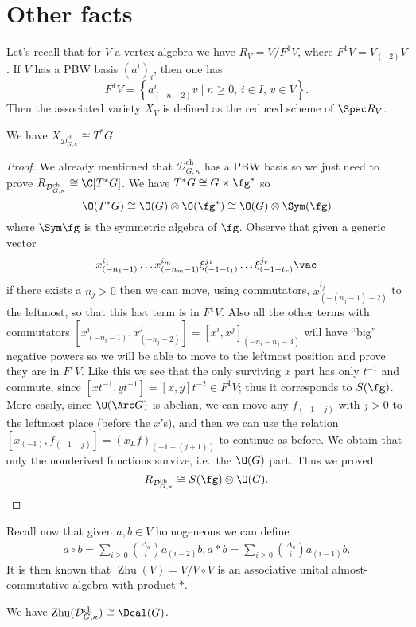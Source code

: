 \documentclass[a4paper, 10pt]{article}
\newcommand{\Dc}{ \mathcal{D}^{\mathrm{ch}}_{G, \kappa} }         %
\DeclareMathOperator{\Zhu}{ Zhu}                             %
\begin{document}
    \section{Other facts}
        Let's recall that for $V$ a vertex algebra we have $R_V = V/F^1V$, where $F^1V= V_{(-2)}V$. If $V$ has a PBW basis $(a^i)_i$, then one has \[F^1V = \left\{a^i_{(-n-2)}v \mid n \geq 0,\, i \in I,\, v \in V \right\}. \]
        Then the associated variety $X_V$ is defined as the reduced scheme of $\Spec R_V$.
        \begin{prop}
            We have $X_{\Dc} \cong T^*G$.
        \end{prop}
        \begin{proof}
            We already mentioned that $\Dc$ has a PBW basis so we just need to prove $R_{\Dc} \cong \C[T^*G]$. We have $T^*G \cong G \times \fg^*$ so \[\O(T^*G) \cong \O(G) \otimes \O(\fg^*) \cong \O(G) \otimes \Sym (\fg)\] where $\Sym\fg$ is the symmetric algebra of $\fg$. Observe that given a generic vector \[x^{i_1}_{(-n_1-1)}\dots x^{i_m}_{(-n_m-1)}\xi^{j_1}_{(-1-t_1)}\dots\xi^{j_r}_{(-1-t_r)} \vac \] if there exists a $n_j > 0$ then we can move, using commutators, $x^{i_j}_{(-(n_j-1)-2)}$ to the leftmost, so that this last term is in $F^1V$. Also all the other terms with commutators $[x^i_{(-n_i-1)}, x^j_{(-n_j-2)}] = [x^i, x^j]_{(-n_i-n_j-3)}$ will have ``big'' negative powers so we will be able to move to the leftmost position and prove they are in $F^1V$.
            Like this we see that the only surviving $x$ part has only $t^{-1}$ and commute, since $[xt^{-1}, yt^{-1}] = [x,y]t^{-2} \in F^1V$; thus it corresponds to $S(\fg)$. More easily, since $\O(\Arc G)$ is abelian, we can move any $f_{(-1-j)}$ with $j > 0$ to the leftmost place (before the $x$'s), and then we can use the relation $[x_{(-1)}, f_{(-1-j)}] = (x_Lf)_{(-1-(j+1))}$ to continue as before. We obtain that only the nonderived functions survive, i.e.\ the $\O(G)$ part. Thus we proved \[R_{\Dc} \cong S(\fg) \otimes \O(G). \qedhere \]
        \end{proof}
        Recall now that given $a, b \in V$ homogeneous we can define 
        \begin{gather*}
            a \circ b = \sum_{i \geq 0} \binom{\Delta_a}{i} a_{(i-2)}b,
            a * b = \sum_{i \geq 0} \binom{\Delta_a}{i} a_{(i-1)}b.
        \end{gather*}
        It is then known that $\Zhu(V) = V/V \circ V$ is an associative unital almost-commutative algebra with product $*$.
        \begin{prop}
            We have $\mathrm{Zhu}(\Dc) \cong \Dcal(G)$.
        \end{prop}
\end{document}
